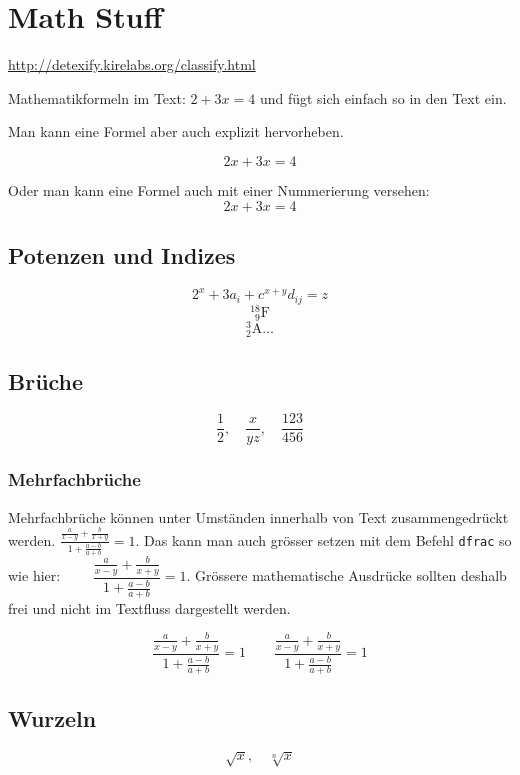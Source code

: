 \documentclass[10pt, a4paper]{article}
\numberwithin{equation}{section}
\numberwithin{figure}{section}
\begin{document}
\section{Math Stuff}

\url{http://detexify.kirelabs.org/classify.html}

Mathematikformeln im Text: \( 2 + 3x = 4\) und fügt sich einfach so in den Text ein.

Man kann eine Formel aber auch explizit hervorheben.

\[ 2x + 3x = 4 \]

Oder man kann eine Formel auch mit einer Nummerierung versehen:
\begin{equation}
2x + 3x = 4
\end{equation}

\subsection{Potenzen und Indizes}

\[ 2^x + 3a_i + c^{x+y}d_{ij} = z  \]
\[{}^{18}_{\phantom{1}9}\mathrm{F}\]
\[ {}^3_2\mathrm{A} \ldots \]


\subsection{Brüche}

\[\frac{1}{2}, \quad \frac{x}{yz},\quad \frac{123}{456}\]

\subsubsection{Mehrfachbrüche}

Mehrfachbrüche können unter Umständen innerhalb von Text zusammengedrückt werden. \( \frac{\frac{a}{x-y}+\frac{b}{x+y}}{1+\frac{a-b}{a+b}} = 1. \) Das kann man auch gr\"osser setzen mit dem Befehl \texttt{dfrac} so wie hier: \( \qquad \dfrac{\frac{a}{x-y}+\frac{b}{x+y}}{1+\frac{a-b}{a+b}} = 1 \). Grössere mathematische Ausdrücke sollten deshalb frei und nicht im Textfluss dargestellt werden.

\[\frac{\frac{a}{x-y}+\frac{b}{x+y}}{1+\frac{a-b}{a+b}} = 1 \qquad \dfrac{\frac{a}{x-y}+\frac{b}{x+y}}{1+\frac{a-b}{a+b}} = 1 \]

\subsection{Wurzeln}

\[ \sqrt{x},\quad \sqrt[n]{x}  \]
\end{document}
